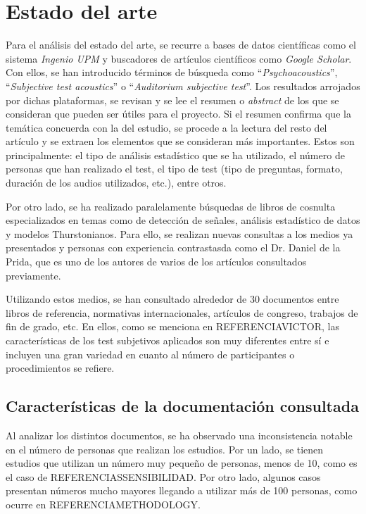 \documentclass[11pt,a4paper]{book}
\author{Víctor de Tejada Molera}
\begin{document}
\chapter{Estado del arte}
    Para el análisis del estado del arte, se recurre a bases de datos científicas como el sistema \textit{Ingenio UPM} y buscadores de artículos científicos como \textit{Google Scholar}. Con ellos, se han introducido términos de búsqueda como ``\textit{Psychoacoustics}'', ``\textit{Subjective test acoustics}'' o ``\textit{Auditorium subjective test}''. Los resultados arrojados por dichas plataformas, se revisan y se lee el resumen o \textit{abstract} de los que se consideran que pueden ser útiles para el proyecto. Si el resumen confirma que la temática concuerda con la del estudio, se procede a la lectura del resto del artículo y se extraen los elementos que se consideran más importantes. Estos son principalmente: el tipo de análisis estadístico que se ha utilizado, el número de personas que han realizado el test, el tipo de test (tipo de preguntas, formato, duración de los audios utilizados, etc.), entre otros.
    
    Por otro lado, se ha realizado paralelamente búsquedas de libros de cosnulta especializados en temas como de detección de señales, análisis estadístico de datos y modelos Thurstonianos. Para ello, se realizan nuevas consultas a los medios ya presentados y personas con experiencia contrastasda como el Dr. Daniel de la Prida, que es uno de los autores de varios de los artículos consultados previamente.\newline
    
    Utilizando estos medios, se han consultado alrededor de 30 documentos entre libros de referencia, normativas internacionales, artículos de congreso, trabajos de fin de grado, etc. En ellos, como se menciona en REFERENCIAVICTOR, las características de los test subjetivos aplicados son muy diferentes entre sí e incluyen una gran variedad en cuanto al número de participantes o procedimientos se refiere.
    
    \section{Características de la documentación consultada}
    
    Al analizar los distintos documentos, se ha observado una inconsistencia notable en el número de personas que realizan los estudios. Por un lado, se tienen estudios que utilizan un número muy pequeño de personas, menos de 10, como es el caso de REFERENCIASSENSIBILIDAD. Por otro lado, algunos casos presentan números mucho mayores llegando a utilizar más de 100 personas, como ocurre en REFERENCIAMETHODOLOGY. 
    
\end{document}
